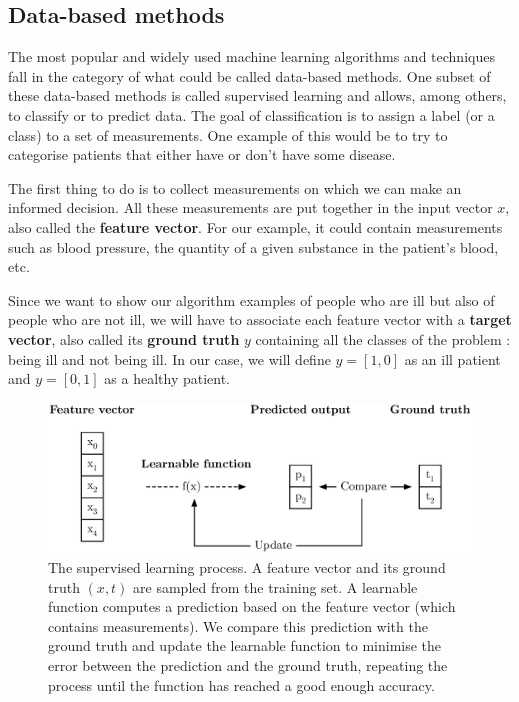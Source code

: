 \subsection{Data-based methods}
The most popular and widely used machine learning algorithms and techniques
fall in the category of what could be called data-based methods. One subset
of these data-based methods is called supervised learning and 
allows, among others, to classify or to predict data. 
The goal of classification is to assign a label (or a class) to a set of 
measurements. One example of this would be
to try to categorise patients that either have or don't have some disease.

The first thing to do is to collect measurements on which we can make an
informed decision. All these measurements are put together in 
the input vector $x$, also called the \textbf{feature vector}. For our example,
it could contain measurements such as blood pressure, the 
quantity of a given substance in the patient's blood, etc.

Since we want to show our algorithm examples of people who are ill but
also of people who are not ill, we will have to associate each feature vector
with a \textbf{target vector}, also called its \textbf{ground truth} $y$ 
containing all the classes of the problem : 
being ill and not being ill. In our case, we will define $y = [1, 0]$ as
an ill patient and $y = [0, 1]$ as a healthy patient.\\

\begin{figure}
	\centering
	\includegraphics[width=0.8\linewidth]{fig/supervised_ml.eps}
	\caption{The supervised learning process. A feature vector and its ground
	truth $(x, t)$ are sampled from the training set. A learnable
	function computes a prediction based on the feature vector (which 
	contains measurements). We compare this prediction with the ground 
	truth and update the learnable function to minimise the error
	between the prediction and the ground truth, repeating the process
	until the function has reached a good enough accuracy.}
	\label{fig:supervised_ml}
\end{figure}


